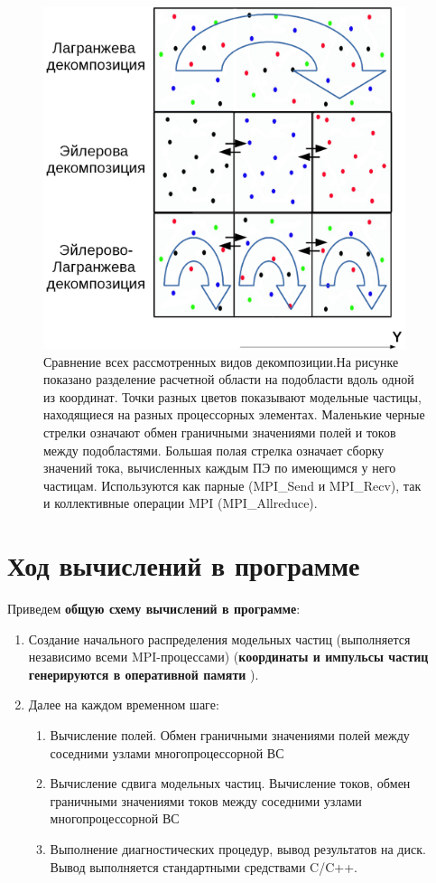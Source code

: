 \begin{figure}[ht]
\begin{center}
\includegraphics[height=10cm,keepaspectratio]{images/decomp_all.png}
\end{center}
\caption{Сравнение всех рассмотренных видов декомпозиции.На рисунке показано разделение расчетной области на подобласти вдоль одной из координат. Точки разных цветов показывают модельные частицы, находящиеся на разных процессорных  элементах. Маленькие черные стрелки означают обмен граничными значениями полей и токов между подобластями. Большая полая стрелка означает сборку значений тока, вычисленных каждым ПЭ по имеющимся у него частицам. Используются как  парные (MPI\_Send и MPI\_Recv), так и коллективные операции MPI (MPI\_Allreduce).}
\label{decomp_all}
\end{figure}



\clearpage

\section{Ход вычислений в программе}

Приведем \textbf{общую схему вычислений в программе}:
\begin{enumerate}
	\item Создание начального 
	распределения модельных частиц
	(выполняется независимо 
	всеми MPI-процессами) (\textbf{координаты и импульсы частиц генерируются в оперативной памяти} ). 
	\item Далее на каждом временном шаге:
	\begin{enumerate}
		\item Вычисление полей. Обмен граничными значениями полей между соседними узлами многопроцессорной ВС
		\item Вычисление сдвига модельных частиц. Вычисление токов, обмен граничными значениями токов между соседними узлами многопроцессорной ВС
		\item Выполнение диагностических процедур, вывод результатов на диск. Вывод выполняется стандартными средствами C/C++.
	\end{enumerate}	
\end{enumerate}

